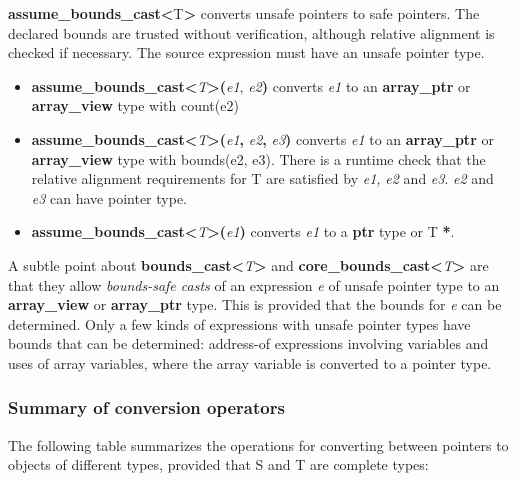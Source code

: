 \documentclass[]{article}
\begin{document}
\textbf{assume\_bounds\_cast\textless{}}T\textbf{\textgreater{}}
converts unsafe pointers to safe pointers. The declared bounds are
trusted without verification, although relative alignment is checked if
necessary. The source expression must have an unsafe pointer type.

\begin{itemize}
\item
  \textbf{assume\_bounds\_cast\textless{}}\emph{T}\textbf{\textgreater{}(}\emph{e1},
  \emph{e2}\textbf{)} converts \emph{e1} to an \textbf{array\_ptr} or
  \textbf{array\_view} type with count(e2)
\item
  \textbf{assume\_bounds\_cast\textless{}}\emph{T}\textbf{\textgreater{}(}\emph{e1}\textbf{,}
  \emph{e2}\textbf{,} \emph{e3}\textbf{)} converts \emph{e1} to an
  \textbf{array\_ptr} or \textbf{array\_view} type with bounds(e2, e3).
  There is a runtime check that the relative alignment requirements for
  T are satisfied by \emph{e1,} \emph{e2} and \emph{e3}. \emph{e2} and
  \emph{e3} can have pointer type.
\item
  \textbf{assume\_bounds\_cast\textless{}}\emph{T}\textbf{\textgreater{}(}\emph{e1}\textbf{)}
  converts \emph{e1} to a \textbf{ptr} type or T \textbf{*}.
\end{itemize}

A subtle point about
\textbf{bounds\_cast\textless{}}\emph{T}\textbf{\textgreater{}} and
\textbf{core\_bounds\_cast\textless{}}\emph{T}\textbf{\textgreater{}}
are that they allow \emph{\emph{bounds-safe casts}} of an expression
\emph{e} of unsafe pointer type to an \textbf{array\_view} or
\textbf{array\_ptr} type. This is provided that the bounds for \emph{e}
can be determined. Only a few kinds of expressions with unsafe pointer
types have bounds that can be determined: address-of expressions
involving variables and uses of array variables, where the array
variable is converted to a pointer type.

\subsubsection{\texorpdfstring{\protect\hypertarget{ux5fToc437460801}{}{\protect\hypertarget{ux5fToc440445482}{}{\protect\hypertarget{ux5fToc440449264}{}{\protect\hypertarget{ux5fToc440551914}{}{}}}}Summary
of conversion
operators}{Summary of conversion operators}}\label{summary-of-conversion-operators}

The following table summarizes the operations for converting between
pointers to objects of different types, provided that S and T are
complete types:
\end{document}
